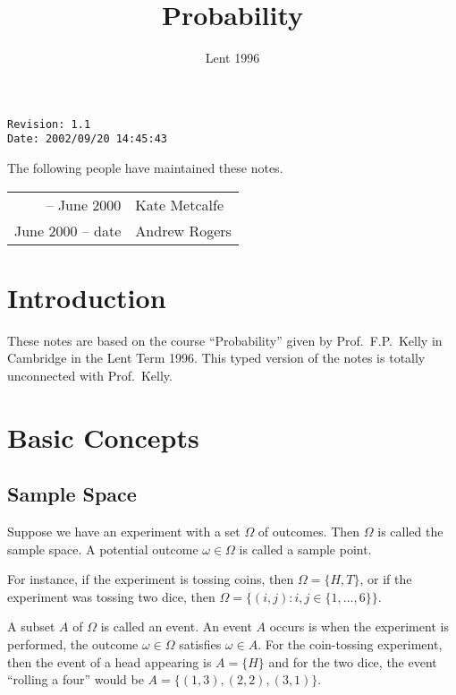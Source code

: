 \documentclass{notes}
\theoremstyle{plain}
\begin{document}
\frontmatter
\title{Probability}
\date{Lent 1996}
\maketitle

\thispagestyle{empty}
\noindent\verb$Revision: 1.1 $\hfill\\
\noindent\verb$Date: 2002/09/20 14:45:43 $\hfill

\vspace{1.5in}

The following people have maintained these notes.

\begin{center}
\begin{tabular}{ r  l}
-- June 2000 & Kate Metcalfe \\
June 2000 -- date & Andrew Rogers
\end{tabular}
\end{center}

\tableofcontents

\chapter{Introduction}

These notes are based on the course ``Probability''
given by Prof.~F.P.~Kelly in Cambridge in the Lent Term 1996.  This
typed version of the notes is totally unconnected with Prof.~Kelly.

\alsoavailable
\archimcopyright

\mainmatter

\chapter{Basic Concepts}

\section{Sample Space}

Suppose we have an experiment with a set $\Omega$ of outcomes.  Then
$\Omega$ is called the sample space.  A potential outcome $\omega \in \Omega$
is called a sample point.

For instance, if the experiment is tossing coins, then $\Omega = \{ H, T \}$,
or if the experiment was tossing two dice, then $\Omega = \{ (i,j)
: i,j \in \{ 1,\dots, 6 \} \}$.

A subset $A$ of $\Omega$ is called an event.  An event $A$ occurs is when
the experiment is performed, the outcome $\omega \in \Omega$ satisfies
$\omega \in A$.  For the coin-tossing experiment, then the event of a 
head appearing is $A = \{ H \}$ and for the two dice, the event ``rolling
a four'' would be $A = \{ (1,3), (2,2), (3,1) \}$.
\end{document}
